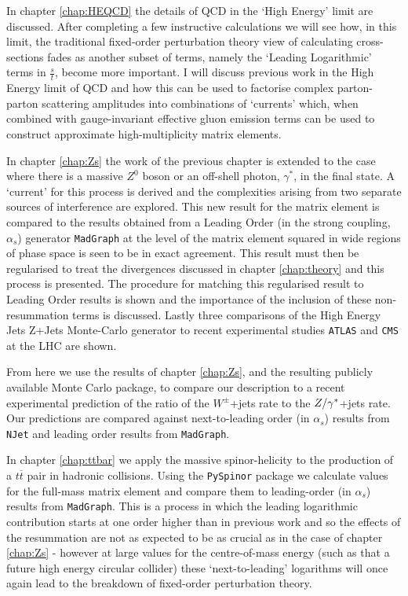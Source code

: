 	In chapter \ref{chap:HEQCD} the details of QCD in the `High Energy' limit are discussed.  After completing a few instructive calculations we will see how,
	in this limit, the traditional fixed-order perturbation theory view of calculating cross-sections fades as another subset of terms, namely the `Leading
	Logarithmic' terms in $\frac{s}{t}$, become more important.  I will discuss previous work in the High Energy limit of QCD and how this can be used to factorise
	complex parton-parton scattering amplitudes into combinations of `currents' which, when combined with gauge-invariant effective gluon emission terms can be used to
	construct approximate high-multiplicity matrix elements.

	In chapter \ref{chap:Zs} the work of the previous chapter is extended to the case where there is a massive $Z^0$ boson or an off-shell photon, $\gamma^*$,
	in the final state.  A `current' for this process is derived and the complexities arising from two separate sources of interference are explored.
	This new result for the matrix element is compared to the results obtained from a Leading Order (in the strong coupling, $\alpha_s$) generator
	\texttt{MadGraph} at the level of the matrix element squared in wide regions of phase space is seen to be in exact agreement.
	This result must then be regularised to treat the divergences discussed in chapter \ref{chap:theory} and this process is presented.
	The procedure for matching this regularised result to Leading Order results is shown and the importance of the inclusion of these
	non-resummation terms is discussed. Lastly three comparisons of the High Energy Jets Z+Jets Monte-Carlo generator to recent experimental
	studies \texttt{ATLAS} and \texttt{CMS} at the LHC are shown.

	From here we use the results of chapter \ref{chap:Zs}, and the resulting publicly available Monte Carlo package, to compare our description to
	a recent experimental prediction of the ratio of the $W^\pm$+jets rate to the ${Z/\gamma^*}$+jets rate.  Our predictions are compared against
	next-to-leading order (in $\alpha_s$) results from \texttt{NJet} and leading order results from \texttt{MadGraph}.

	In chapter \ref{chap:ttbar} we apply the massive spinor-helicity to the production of a $t\overline t$ pair in hadronic collisions.  Using the
	\texttt{PySpinor} package we calculate values for the full-mass matrix element and compare them to leading-order (in $\alpha_s$) results from
	\texttt{MadGraph}.  This is a process in which the leading logarithmic contribution starts at one order higher than in previous work and so the effects
	of the resummation are not as expected to be as crucial as in the case of chapter \ref{chap:Zs} - however at large values for the centre-of-mass energy
	(such as that a future high energy circular collider) these `next-to-leading' logarithms will once again lead to the breakdown of fixed-order
	perturbation theory.


